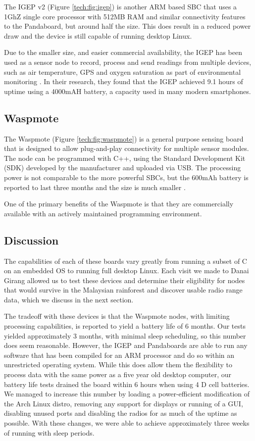 The IGEP v2 (Figure \ref{tech:fig:igep}) is another ARM based SBC that uses a 1GhZ single core processor with 512MB RAM and similar connectivity features to the Pandaboard, but around half the size. This does result in a reduced power draw and the device is still capable of running desktop Linux.

Due to the smaller size, and easier commercial availability, the IGEP has been used as a sensor node to record, process and send readings from multiple devices, such as air temperature, GPS and oxygen saturation as part of environmental monitoring \cite{Resch}. In their research, they found that the IGEP achieved 9.1 hours of uptime using a 4000mAH battery, a capacity used in many modern smartphones.

\subsection{Waspmote}\label{tech:waspmote}
The Waspmote (Figure \ref{tech:fig:waspmote}) is a general purpose sensing board that is designed to allow plug-and-play connectivity for multiple sensor modules. The node can be programmed with C++, using the Standard Development Kit (SDK) developed by the manufacturer and uploaded via USB. The processing power is not comparable to the more powerful SBCs, but the 600mAh battery is reported to last three months and the size is much smaller \cite{waspmote}.

One of the primary benefits of the Waspmote is that they are commercially available with an actively maintained programming environment.

\subsection{Discussion} \label{tech:hw:conc}
The capabilities of each of these boards vary greatly from running a subset of C on an embedded OS to running full desktop Linux. Each visit we made to Danai Girang allowed us to test these devices and determine their eligibility for nodes that would survive in the Malaysian rainforest and discover usable radio range data, which we discuss in the next section.

The tradeoff with these devices is that the Waspmote nodes, with limiting processing capabilities, is reported to yield a battery life of 6 months. Our tests yielded approximately 3 months, with minimal sleep scheduling, so this number does seem reasonable. However, the IGEP and Pandaboards are able to run any software that has been compiled for an ARM processor and do so within an unrestricted operating system. While this does allow them the flexibility to process data with the same power as a five year old desktop computer, our battery life tests drained the board within 6 hours when using 4 D cell batteries. We managed to increase this number by loading a power-efficient modification of the Arch Linux distro, removing any support for displays or running of a GUI, disabling unused ports and disabling the radios for as much of the uptime as possible. With these changes, we were able to achieve approximately three weeks of running with sleep periods.

